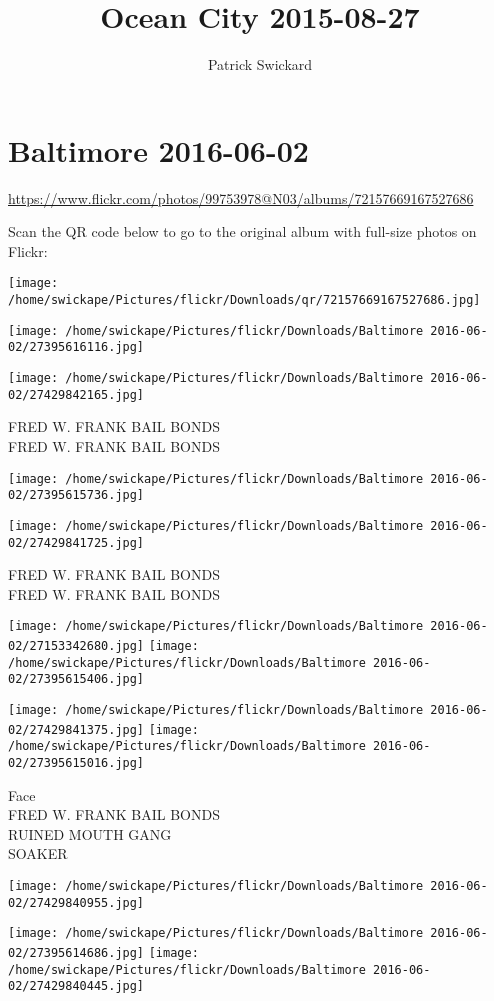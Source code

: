 \documentclass[10pt,letterpaper]{article}
\title{Ocean City 2015-08-27}
\author{Patrick Swickard}
\date{}
\begin{document}
\section*{Baltimore 2016-06-02}

\url{https://www.flickr.com/photos/99753978@N03/albums/72157669167527686}

Scan the QR code below to go to the original album with full-size photos on Flickr:

\texttt{[image: /home/swickape/Pictures/flickr/Downloads/qr/72157669167527686.jpg]}
\pagebreak

\texttt{[image: /home/swickape/Pictures/flickr/Downloads/Baltimore 2016-06-02/27395616116.jpg]}

\vspace{0.25in}
\texttt{[image: /home/swickape/Pictures/flickr/Downloads/Baltimore 2016-06-02/27429842165.jpg]}

FRED W. FRANK BAIL BONDS\\
FRED W. FRANK BAIL BONDS
\pagebreak

\texttt{[image: /home/swickape/Pictures/flickr/Downloads/Baltimore 2016-06-02/27395615736.jpg]}

\vspace{0.25in}
\texttt{[image: /home/swickape/Pictures/flickr/Downloads/Baltimore 2016-06-02/27429841725.jpg]}

FRED W. FRANK BAIL BONDS\\
FRED W. FRANK BAIL BONDS
\pagebreak

\texttt{[image: /home/swickape/Pictures/flickr/Downloads/Baltimore 2016-06-02/27153342680.jpg]}
\texttt{[image: /home/swickape/Pictures/flickr/Downloads/Baltimore 2016-06-02/27395615406.jpg]}

\texttt{[image: /home/swickape/Pictures/flickr/Downloads/Baltimore 2016-06-02/27429841375.jpg]}
\texttt{[image: /home/swickape/Pictures/flickr/Downloads/Baltimore 2016-06-02/27395615016.jpg]}

Face\\
FRED W. FRANK BAIL BONDS\\
RUINED MOUTH GANG\\
SOAKER
\pagebreak

\texttt{[image: /home/swickape/Pictures/flickr/Downloads/Baltimore 2016-06-02/27429840955.jpg]}

\vspace{0.25in}
\texttt{[image: /home/swickape/Pictures/flickr/Downloads/Baltimore 2016-06-02/27395614686.jpg]}
\texttt{[image: /home/swickape/Pictures/flickr/Downloads/Baltimore 2016-06-02/27429840445.jpg]}
\end{document}
